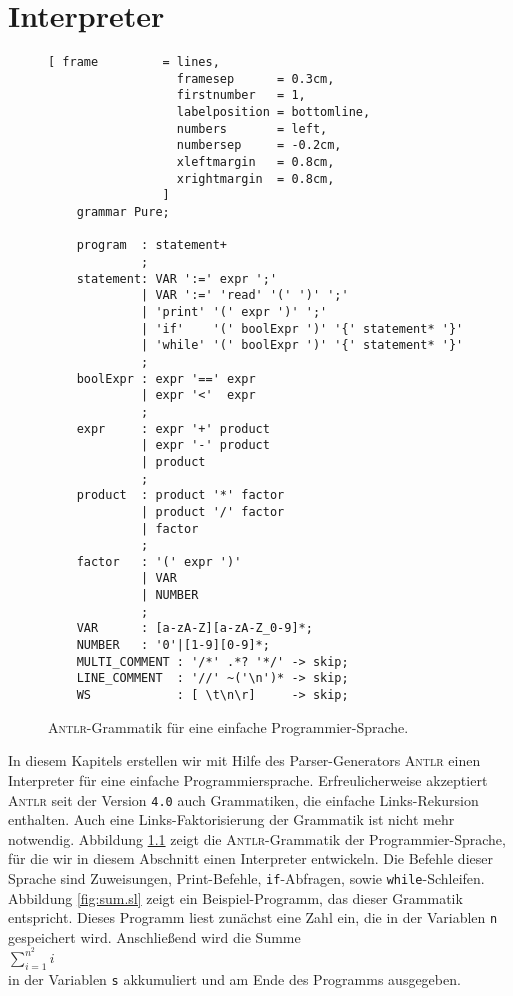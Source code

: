 \chapter{Interpreter \label{chapter:interpreter}}


\begin{figure}[!ht]
\centering
\begin{Verbatim}[ frame         = lines, 
                  framesep      = 0.3cm, 
                  firstnumber   = 1,
                  labelposition = bottomline,
                  numbers       = left,
                  numbersep     = -0.2cm,
                  xleftmargin   = 0.8cm,
                  xrightmargin  = 0.8cm,
                ]
    grammar Pure;
    
    program  : statement+
             ;  
    statement: VAR ':=' expr ';'
             | VAR ':=' 'read' '(' ')' ';'
             | 'print' '(' expr ')' ';'
             | 'if'    '(' boolExpr ')' '{' statement* '}'
             | 'while' '(' boolExpr ')' '{' statement* '}'
             ;
    boolExpr : expr '==' expr
             | expr '<'  expr
             ;
    expr     : expr '+' product
             | expr '-' product
             | product
             ;
    product  : product '*' factor
             | product '/' factor
             | factor
             ;
    factor   : '(' expr ')'
             | VAR
             | NUMBER
             ;
    VAR      : [a-zA-Z][a-zA-Z_0-9]*;
    NUMBER   : '0'|[1-9][0-9]*;
    MULTI_COMMENT : '/*' .*? '*/' -> skip;
    LINE_COMMENT  : '//' ~('\n')* -> skip;
    WS            : [ \t\n\r]     -> skip; 
\end{Verbatim}
\vspace*{-0.3cm}
\caption{\textsc{Antlr}-Grammatik f\"ur eine einfache Programmier-Sprache.}
\label{fig:Pure.g4}
\end{figure}

In diesem Kapitels erstellen wir mit Hilfe des Parser-Generators \textsc{Antlr} einen
Interpreter f\"ur eine einfache Programmiersprache.  Erfreulicherweise akzeptiert
\textsc{Antlr} seit der Version \texttt{4.0} auch Grammatiken, die einfache Links-Rekursion
enthalten.  Auch eine Links-Faktorisierung der Grammatik ist nicht mehr notwendig.
Abbildung \ref{fig:Pure.g4} zeigt die \textsc{Antlr}-Grammatik der Programmier-Sprache, f\"ur die wir
in diesem Abschnitt einen Interpreter entwickeln.  Die Befehle dieser Sprache sind Zuweisungen, Print-Befehle,
\texttt{if}-Abfragen, sowie \texttt{while}-Schleifen.  Abbildung \ref{fig:sum.sl} zeigt
ein Beispiel-Programm, das dieser Grammatik entspricht.  Dieses Programm liest zun\"achst eine Zahl
ein, die in der Variablen \texttt{n} gespeichert wird.  Anschlie{\ss}end wird die Summe
\\[0.2cm]
\hspace*{1.3cm}
$\sum\limits_{i=1}^{n^2} i$
\\[0.2cm]
in der Variablen \texttt{s} akkumuliert und am Ende des Programms ausgegeben.


